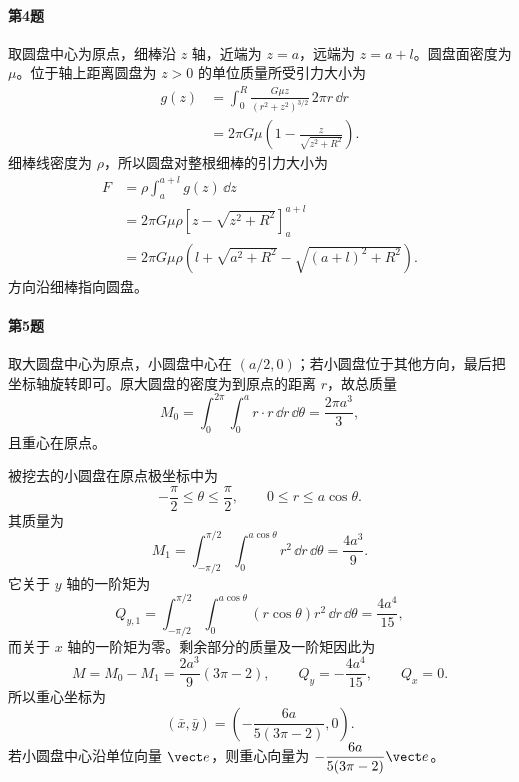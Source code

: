 \paragraph{第4题}
\begin{xsolution}
取圆盘中心为原点，细棒沿 $z$ 轴，近端为 $z=a$，远端为 $z=a+l$。圆盘面密度为 $\mu$。位于轴上距离圆盘为 $z>0$ 的单位质量所受引力大小为
\begin{align*}
 g(z)&=\int_0^R\frac{G\mu z}{(r^2+z^2)^{3/2}}\,2\pi r\,\dd r\\
 &=2\pi G\mu\left(1-\frac{z}{\sqrt{z^2+R^2}}\right).
\end{align*}
细棒线密度为 $\rho$，所以圆盘对整根细棒的引力大小为
\begin{align*}
 F&=\rho\int_a^{a+l}g(z)\,\dd z\\
 &=2\pi G\mu\rho
 \left[z-\sqrt{z^2+R^2}\right]_{a}^{a+l}\\
 &=\boxed{2\pi G\mu\rho
 \left(l+\sqrt{a^2+R^2}-\sqrt{(a+l)^2+R^2}\right)}.
\end{align*}
方向沿细棒指向圆盘。
\end{xsolution}

\paragraph{第5题}
\begin{xsolution}
取大圆盘中心为原点，小圆盘中心在 $(a/2,0)$；若小圆盘位于其他方向，最后把坐标轴旋转即可。原大圆盘的密度为到原点的距离 $r$，故总质量
\[
 M_0=\int_0^{2\pi}\int_0^a r\cdot r\,\dd r\,\dd\theta
 =\frac{2\pi a^3}{3},
\]
且重心在原点。

被挖去的小圆盘在原点极坐标中为
\[
 -\frac\pi2\le\theta\le\frac\pi2,
 \qquad0\le r\le a\cos\theta.
\]
其质量为
\[
 M_1=\int_{-\pi/2}^{\pi/2}\int_0^{a\cos\theta}r^2\,\dd r\,\dd\theta
 =\frac{4a^3}{9}.
\]
它关于 $y$ 轴的一阶矩为
\[
 Q_{y,1}=\int_{-\pi/2}^{\pi/2}\int_0^{a\cos\theta}
 (r\cos\theta)r^2\,\dd r\,\dd\theta
 =\frac{4a^4}{15},
\]
而关于 $x$ 轴的一阶矩为零。剩余部分的质量及一阶矩因此为
\[
 M=M_0-M_1=\frac{2a^3}{9}(3\pi-2),
 \qquad Q_y=-\frac{4a^4}{15},
 \qquad Q_x=0.
\]
所以重心坐标为
\[
 \boxed{
 \left(\bar x,\bar y\right)
 =\left(-\frac{6a}{5(3\pi-2)},0\right)}.
\]
若小圆盘中心沿单位向量 $\vect e$，则重心向量为
$-\dfrac{6a}{5(3\pi-2)}\vect e$。
\end{xsolution}

